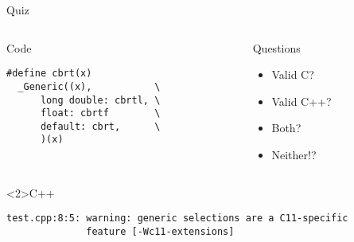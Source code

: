 \documentclass[presentation,aspectratio=169]{beamer}
\begin{document}
\begin{frame}[fragile,label={sec:org23c4234}]{Quiz}
\begin{columns}
\begin{column}{0.48\columnwidth}
\begin{block}{Code}
\begin{verbatim}
#define cbrt(x)
  _Generic((x),           \
      long double: cbrtl, \
      float: cbrtf        \
      default: cbrt,      \
      )(x)
\end{verbatim}
\end{block}
\end{column}

\begin{column}{0.48\columnwidth}
\begin{block}{Questions}
\begin{itemize}
\item Valid C?
\item Valid C++?
\item Both?
\item Neither!?
\end{itemize}
\end{block}
\end{column}
\end{columns}

\begin{block}<2>{C++}
\begin{verbatim}
test.cpp:8:5: warning: generic selections are a C11-specific
              feature [-Wc11-extensions]
\end{verbatim}
\end{block}
\end{frame}

\end{document}
